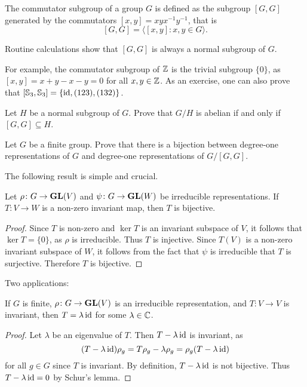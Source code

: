 The commutator subgroup of a group $G$ is defined as the subgroup $[G,G]$ 
generated by the commutators $[x,y]=xyx^{-1}y^{-1}$, that is  
 \[
        [G,G]=\langle[x,y]: x,y\in G\rangle.
\]

Routine calculations show that $[G,G]$ is always a normal subgroup of $G$. 

For example, the commutator subgroup of $\mathbb{Z}$ is the trivial subgroup $\{0\}$, 
as $[x,y]=x+y-x-y=0$ for all $x,y\in\mathbb{Z}$. As an exercise, one can also prove that 
$[\mathbb{S}_3,\mathbb{S}_3]=\{\operatorname{id},(123),(132)\}$.

\begin{exercise}
\label{xca:commutator}
Let $H$ be a normal subgroup of $G$. Prove that
$G/H$ is abelian if and only if $[G,G]\subseteq H$.
\end{exercise}

\begin{exercise}
Let $G$ be a finite group.
Prove that there is a bijection between degree-one representations of $G$ and
degree-one representations of $G/[G,G]$.
\end{exercise}

The following result is simple and crucial. 

\begin{lemma}[Schur]
    Let $\rho\colon G\to\mathbf{GL}(V)$ and $\psi\colon G\to\mathbf{GL}(W)$ be irreducible representations. If 
    $T\colon V\to W$ is a non-zero invariant map, then $T$ is bijective.  
\end{lemma}

\begin{proof}
    Since $T$ is non-zero and $\ker T$ is an invariant subspace of $V$, it follows that $\ker T=\{0\}$, as $\rho$ is irreducible. Thus 
    $T$ is injective. Since $T(V)$ is a non-zero invariant subspace of $W$, it follows from the fact that $\psi$ is irreducible 
    that $T$ is surjective. Therefore $T$ 
    is bijective.  
\end{proof}

Two applications:

\begin{proposition}
    If $G$ is finite, $\rho\colon G\to\mathbf{GL}(V)$ is an irreducible representation, and $T\colon V\to V$ is invariant, then 
    $T=\lambda\operatorname{id}$ for some $\lambda\in\mathbb{C}$. 
\end{proposition}

\begin{proof}
    Let $\lambda$ be an eigenvalue of $T$. Then $T-\lambda\operatorname{id}$ is invariant, as 
    \[
    (T-\lambda\operatorname{id})\rho_g=T\rho_g-\lambda\rho_g=\rho_g(T-\lambda\operatorname{id})
    \]
    for all $g\in G$ since $T$ is invariant. By definition, 
    $T-\lambda\operatorname{id}$ is not bijective. Thus $T-\lambda\operatorname{id}=0$ by Schur's lemma.
\end{proof}

